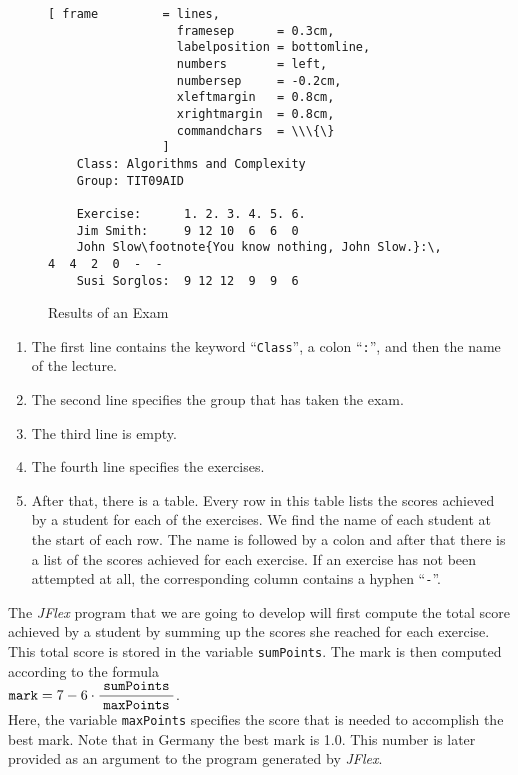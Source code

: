 \begin{figure}[!h]
\centering
\begin{Verbatim}[ frame         = lines, 
                  framesep      = 0.3cm, 
                  labelposition = bottomline,
                  numbers       = left,
                  numbersep     = -0.2cm,
                  xleftmargin   = 0.8cm,
                  xrightmargin  = 0.8cm,
                  commandchars  = \\\{\}
                ]
    Class: Algorithms and Complexity
    Group: TIT09AID
    
    Exercise:      1. 2. 3. 4. 5. 6.
    Jim Smith:     9 12 10  6  6  0
    John Slow\footnote{You know nothing, John Slow.}:\,    4  4  2  0  -  -
    Susi Sorglos:  9 12 12  9  9  6
\end{Verbatim}
\vspace*{-0.3cm}
\caption{Results of an Exam}
\label{fig:result.txt}
\end{figure}


\begin{enumerate}
\item The first line contains the keyword ``\texttt{Class}'', a colon ``\texttt{:}'', and then the
      name of the lecture. 
\item The second line specifies the group that has taken the exam.
\item The third line is empty.
\item The fourth line specifies the exercises.
\item After that, there is a table.  Every row in this table lists the scores achieved by a student
      for each of the exercises.  We find the name of each student at the start of each row.  The
      name is followed by a colon and after that there is a list of the scores achieved for each
      exercise.  If an exercise has not been attempted at all, the corresponding column contains a hyphen
      ``\texttt{-}''.
\end{enumerate}
The \textsl{JFlex} program that we are going to develop will first compute the total score achieved
by a student by summing up the scores she reached for each exercise.  This total score is stored in
the variable \texttt{sumPoints}.  The mark is then computed according to the formula
\\[0.2cm]
\hspace*{1.3cm}
$\displaystyle\texttt{mark} = 7 - 6 \cdot \frac{\;\texttt{sumPoints}\;}{\texttt{maxPoints}}$.
\\[0.2cm]
Here, the  variable \texttt{maxPoints} specifies the score that is needed to accomplish the best
mark. Note that in  Germany the best mark is 1.0.  This number is later provided as an argument to the
program generated by \textsl{JFlex}.


